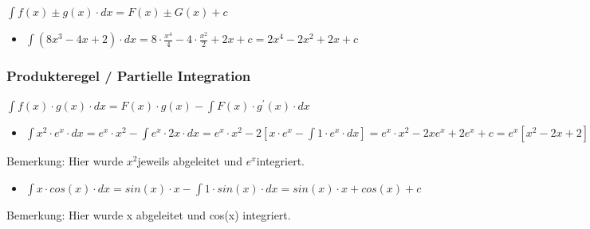 $\int f(x)\pm g(x)\cdot dx=F(x)\pm G(x)+c$
\begin{itemize}
\item $\int(8x^{3}-4x+2)\cdot dx=8\cdot\frac{x^{4}}{4}-4\cdot\frac{x^{2}}{2}+2x+c=2x^{4}-2x^{2}+2x+c$
\end{itemize}

\subsubsection*{Produkteregel / Partielle Integration}

$\int f(x)\cdot g(x)\cdot dx=F(x)\cdot g(x)-\int F(x)\cdot g^{\prime}(x)\cdot dx$
\begin{itemize}
\item $\int x^{2}\cdot e^{x}\cdot dx=e^{x}\cdot x^{2}-\int e^{x}\cdot2x\cdot dx=e^{x}\cdot x^{2}-2[x\cdot e^{x}-\int1\cdot e^{x}\cdot dx]=e^{x}\cdot x^{2}-2xe^{x}+2e^{x}+c=e^{x}[x^{2}-2x+2]+c$
\end{itemize}
Bemerkung: Hier wurde $x^{2}$jeweils abgeleitet und $e^{x}$integriert.
\begin{itemize}
\item $\int x\cdot cos(x)\cdot dx=sin(x)\cdot x-\int1\cdot sin(x)\cdot dx=sin(x)\cdot x+cos(x)+c$
\end{itemize}
Bemerkung: Hier wurde x abgeleitet und cos(x) integriert.


